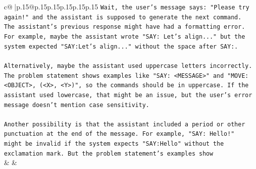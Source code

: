 \documentclass{article}
\begin{document}
{\begin{supertabular}{c@{$\;$}|p{.15\linewidth}@{}p{.15\linewidth}p{.15\linewidth}p{.15\linewidth}p{.15\linewidth}p{.15\linewidth}}
{{{\texttt{Wait, the user's message says: "Please try again!" and the assistant is supposed to generate the next command. The assistant's previous response might have had a formatting error. For example, maybe the assistant wrote "SAY: Let's align..." but the system expected "SAY:Let's align..." without the space after SAY:.} \\
\\ 
\texttt{Alternatively, maybe the assistant used uppercase letters incorrectly. The problem statement shows examples like "SAY: <MESSAGE>" and "MOVE: <OBJECT>, (<X>, <Y>)", so the commands should be in uppercase. If the assistant used lowercase, that might be an issue, but the user's error message doesn't mention case sensitivity.} \\
\\ 
\texttt{Another possibility is that the assistant included a period or other punctuation at the end of the message. For example, "SAY: Hello!" might be invalid if the system expects "SAY:Hello" without the exclamation mark. But the problem statement's examples show} \\
            }
        }
    }
    & & \\ \\


\end{supertabular}}
\end{document}
